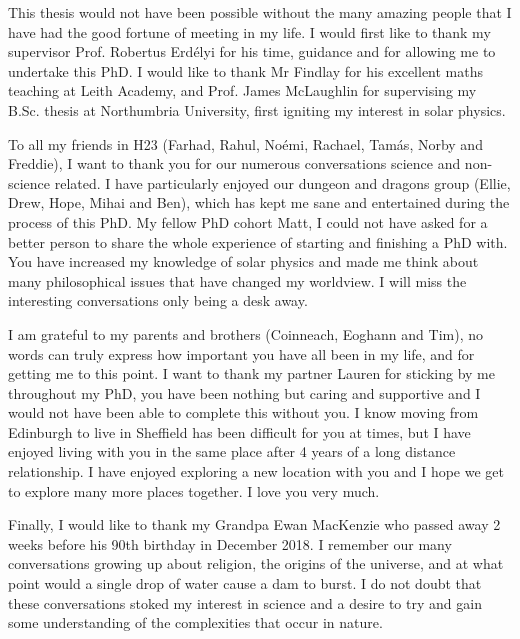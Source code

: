\begin{acknowledgementslong}
This thesis would not have been possible without the many amazing people that I have had the good fortune of meeting in my life. I would first like to thank my supervisor Prof. Robertus Erd\'elyi for his time, guidance and for allowing me to undertake this PhD. I would like to thank Mr Findlay for his excellent maths teaching at Leith Academy, and Prof. James McLaughlin for supervising my B.Sc. thesis at Northumbria University, first igniting my interest in solar physics.

To all my friends in H23 (Farhad, Rahul, No\'emi, Rachael, Tam\'as, Norby and Freddie), I want to thank you for our numerous conversations science and non-science related. I have particularly enjoyed our dungeon and dragons group (Ellie, Drew, Hope, Mihai and Ben), which has kept me sane and entertained during the process of this PhD. My fellow PhD cohort Matt, I could not have asked for a better person to share the whole experience of starting and finishing a PhD with. You have increased my knowledge of solar physics and made me think about many philosophical issues that have changed my worldview. I will miss the interesting conversations only being a desk away.

I am grateful to my parents and brothers (Coinneach, Eoghann and Tim), no words can truly express how important you have all been in my life, and for getting me to this point. I want to thank my partner Lauren for sticking by me throughout my PhD, you have been nothing but caring and supportive and I would not have been able to complete this without you. I know moving from Edinburgh to live in Sheffield has been difficult for you at times, but I have enjoyed living with you in the same place after 4 years of a long distance relationship. I have enjoyed exploring a new location with you and I hope we get to explore many more places together. I love you very much.

Finally, I would like to thank my Grandpa Ewan MacKenzie who passed away 2 weeks before his 90th birthday in December 2018. I remember our many conversations growing up about religion, the origins of the universe, and at what point would a single drop of water cause a dam to burst. I do not doubt that these conversations stoked my interest in science and a desire to try and gain some understanding of the complexities that occur in nature. 
\end{acknowledgementslong}